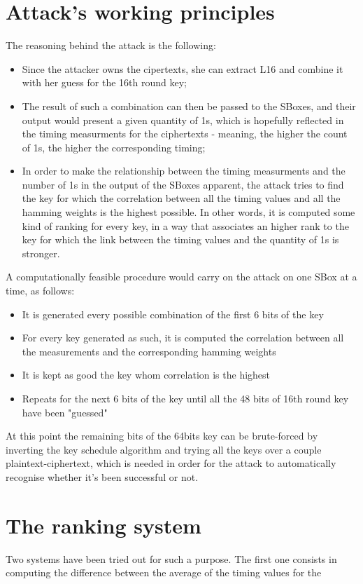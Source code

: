 \documentclass[11pt]{article} %
\begin{document}
\section{Attack's working principles}
The reasoning behind the attack is the following: 
\begin{itemize}
  \item Since the attacker owns the cipertexts, she can extract L16 and combine it with her guess for the 16th round key;
  \item The result of such a combination can then be passed to the SBoxes, and their output would present a given quantity of 1s, which is hopefully reflected in the timing measurments for the ciphertexts - meaning, the higher the count of 1s, the higher the corresponding timing;
  \item In order to make the relationship between the timing measurments and the number of 1s in the output of the SBoxes apparent, the attack tries to find the key for which the correlation between all the timing values and all the hamming weights is the highest possible. In other words, it is computed some kind of ranking for every key, in a way that associates an higher rank to the key for which the link between the timing values and the quantity of 1s is stronger.
\end{itemize}
A computationally feasible procedure would carry on the attack on one SBox at a time, as follows:
\begin{itemize}
	\item It is generated every possible combination of the first 6 bits of the key
	\item For every key generated as such, it is computed the correlation between all the measurements and the corresponding hamming weights
	\item It is kept as good the key whom correlation is the highest 
	\item Repeats for the next 6 bits of the key until all the 48 bits of 16th round key have been "guessed"
\end{itemize}
At this point the remaining bits of the 64bits key can be brute-forced by inverting the key schedule algorithm and trying all the keys over a couple plaintext-ciphertext, which is needed in order for the attack to automatically recognise whether it's been successful or not.

\section{The ranking system}
Two systems have been tried out for such a purpose. The first one consists in computing the difference between the average of the timing values for the 
\end{document}
